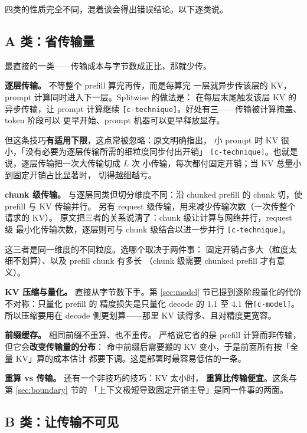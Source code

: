 四类的性质完全不同，混着谈会得出错误结论。以下逐类说。

\subsection{A 类：省传输量}

最直接的一类——传输成本与字节数成正比，那就少传。

\noindent\textbf{逐层传输。} 不等整个 prefill 算完再传，而是每算完
一层就异步传该层的 KV，prompt 计算同时进入下一层。Splitwise 的做法是：
在每层末尾触发该层 KV 的异步传输，让 prompt 计算继续
\texttt{[c-technique]}。好处有三——传输被计算掩盖、token 阶段可以
更早开始、prompt 机器可以更早释放显存。

\noindent 但这条技巧\textbf{有适用下限}，这点常被忽略：原文明确指出，
小 prompt 时 KV 很小，「没有必要为逐层传输所需的细粒度同步付出开销」
\texttt{[c-technique]}。也就是说，逐层传输把一次大传输切成 $L$ 次
小传输，每次都付固定开销；当 KV 总量小到固定开销占比显著时，
切得越细越亏。

\noindent\textbf{chunk 级传输。} 与逐层同类但切分维度不同：沿
chunked prefill 的 chunk 切，使 prefill 与 KV 传输并行。
另有 request 级传输，用来减少传输次数（一次传整个请求的 KV）。
原文把三者的关系说清了：chunk 级让计算与网络并行，request 级
最小化传输次数，逐层则可与 chunk 级结合以进一步并行
\texttt{[c-technique]}。

\noindent 这三者是同一维度的不同粒度。选哪个取决于两件事：
固定开销占多大（粒度太细不划算）、以及 prefill chunk 有多长
（chunk 级需要 chunked prefill 才有意义）。

\noindent\textbf{KV 压缩与量化。} 直接从字节数下手。第
\ref{sec:model} 节已提到逐阶段量化的代价不对称：只量化 prefill 的
精度损失是只量化 decode 的 $1.1$ 至 $4.1$ 倍\texttt{[c-model]}。
所以压缩要用在 decode 侧更划算——那里 KV 读得多、且对精度更宽容。

\noindent\textbf{前缀缓存。} 相同前缀不重算、也不重传。
严格说它省的是 prefill 计算而非传输，但它会\textbf{改变传输量的分布}：
命中前缀后需要搬的 KV 变小，于是前面所有按「全量 KV」算的成本估计
都要下调。这是部署时最容易低估的一条。

\noindent\textbf{重算 vs 传输。} 还有一个非技巧的技巧：KV 太小时，
\textbf{重算比传输便宜}。这条与第 \ref{sec:boundary} 节的
「上下文极短导致固定开销主导」是同一件事的两面。

\subsection{B 类：让传输不可见}

